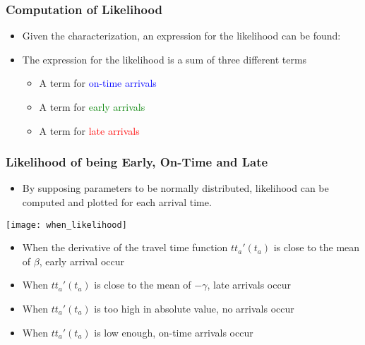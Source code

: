 \documentclass[hyperref={pdfpagelabels=false}]{beamer}
\begin{document}
\begin{frame}
  \frametitle{Computation of Likelihood}
  \begin{itemize}
  \item Given the characterization, an expression for the likelihood can be found:
  \item<2-> The expression for the likelihood is a sum of three different terms
    \begin{itemize}
    \item<2-> A term for \textcolor{blue}{on-time arrivals}
    \item<2-> A term for \textcolor{green}{early arrivals}
    \item<2-> A term for \textcolor{red}{late arrivals}
    \end{itemize}
  \end{itemize}
\end{frame}

\begin{frame}
  \frametitle{Likelihood of being Early, On-Time and Late}
  \begin{itemize}
  \item By supposing parameters to be normally distributed, likelihood can be computed and plotted for each arrival time.
  \end{itemize}
  \begin{center}
    \texttt{[image: when\_likelihood]}
  \end{center}
  \begin{itemize}
  \item<2-> When the derivative of the travel time function \(tt_a'(t_a)\) is close to the mean of \(\beta\), early arrival occur
  \item<3-> When \(tt_a'(t_a)\) is close to the mean of \(-\gamma\), late arrivals occur
  \item<4-> When \(tt_a'(t_a)\) is too high in absolute value, no arrivals occur
  \item<5-> When \(tt_a'(t_a)\) is low enough, on-time arrivals occur
  \end{itemize}

\end{frame}
\end{document}
